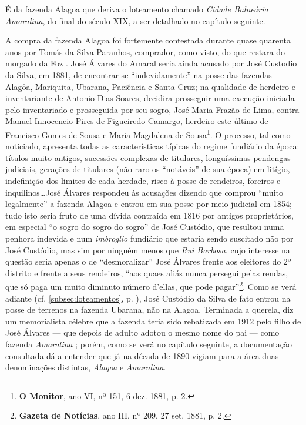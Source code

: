 É da fazenda Alagoa que deriva o loteamento chamado \textit{Cidade Balneária Amaralina}, do final do século XIX, a ser detalhado no capítulo seguinte.

A compra da fazenda Alagoa foi fortemente contestada durante quase quarenta anos por Tomás da Silva Paranhos, comprador, como visto, do que restara do morgado da Foz \cite[p.~118]{campos_alagoa_1942}. José Álvares do Amaral seria ainda acusado por José Custodio da Silva, em 1881, de encontrar-se ``indevidamente'' na posse das fazendas Alagôa, Mariquita, Ubarana, Paciência e Santa Cruz; na qualidade de herdeiro e inventariante de Antonio Dias Soares, decidira prosseguir uma execução iniciada pelo inventariado e prosseguida por seu sogro, José Maria Frazão de Lima, contra Manuel Innocencio Pires de Figueiredo Camargo, herdeiro este último de Francisco Gomes de Sousa e Maria Magdalena de Sousa\footnote{\textbf{O Monitor}, ano VI, nº 151, 6 dez. 1881, p. 2.}. O processo, tal como noticiado, apresenta todas as características típicas do regime fundiário da época: títulos muito antigos, sucessões complexas de titulares, longuíssimas pendengas judiciais, gerações de titulares (não raro os ``notáveis'' de sua época) em litígio, indefinição dos limites de cada herdade, risco à posse de rendeiros, foreiros e inquilinos\dots José Álvares respondeu às acusações dizendo que comprou ``muito legalmente'' a fazenda Alagoa e entrou em sua posse por meio judicial em 1854; tudo isto seria fruto de uma dívida contraída em 1816 por antigos proprietários, em especial ``o sogro do sogro do sogro'' de José Custódio, que resultou numa penhora indevida e num \textit{imbroglio} fundiário que estaria sendo suscitado não por José Custódio, mas sim por ninguém menos que \textit{Rui Barbosa}, cujo interesse na questão seria apenas o de ``desmoralizar'' José Álvares frente aos eleitores do 2º distrito e frente a seus rendeiros, ``aos quaes aliás nunca persegui pelas rendas, que só paga um muito diminuto número d'ellas, que pode pagar''\footnote{\textbf{Gazeta de Notícias}, ano III, nº 209, 27 set. 1881, p. 2.}. Como se verá adiante (cf. \autoref{subsec:loteamentos}, p. \pageref{subsec:loteamentos}), José Custódio da Silva de fato entrou na posse de terrenos na fazenda Ubarana, não na Alagoa. Terminada a querela, diz um memorialista célebre que a fazenda teria sido rebatizada em 1912 pelo filho de José Álvares --- que depois de adulto adotou o mesmo nome do pai --- como fazenda \textit{Amaralina} \cite[p.~118]{campos_alagoa_1942}; porém, como se verá no capítulo seguinte, a documentação consultada dá a entender que já na década de 1890 vigiam para a área duas denominações distintas, \textit{Alagoa} e \textit{Amaralina}.

